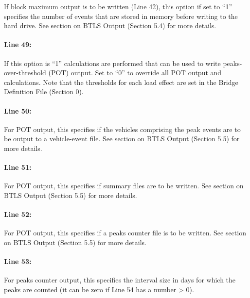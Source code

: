 \documentclass[
]{article}
\begin{document}
If block maximum output is to be written (Line 42), this option if set
to ``1'' specifies the number of events that are stored in memory before
writing to the hard drive. See section on BTLS Output (Section 5.4) for
more details.

\paragraph*{Line 49:}\label{line-49}

If this option is ``1'' calculations are performed that can be used to
write peaks-over-threshold (POT) output. Set to ``0'' to override all
POT output and calculations. Note that the thresholds for each load
effect are set in the Bridge Definition File (Section 0).

\paragraph*{Line 50:}\label{line-50}

For POT output, this specifies if the vehicles comprising the peak
events are to be output to a vehicle-event file. See section on BTLS
Output (Section 5.5) for more details.

\paragraph*{Line 51:}\label{line-51}

For POT output, this specifies if summary files are to be written. See
section on BTLS Output (Section 5.5) for more details.

\paragraph*{Line 52:}\label{line-52}

For POT output, this specifies if a peaks counter file is to be written.
See section on BTLS Output (Section 5.5) for more details.

\paragraph*{Line 53:}\label{line-53}

For peaks counter output, this specifies the interval size in days for
which the peaks are counted (it can be zero if Line 54 has a number
\textgreater{} 0).
\end{document}
